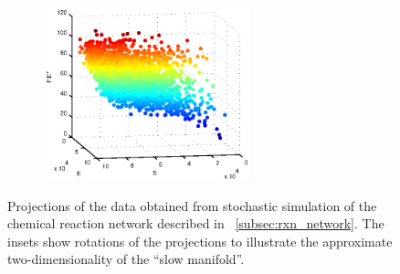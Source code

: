 \begin{figure}[t]
\begin{subfigure}{0.45\textwidth}
\caption{}
\label{subfig:rxn_manifolds3}
\end{subfigure}
\begin{subfigure}{0.45\textwidth}
\includegraphics[height=5cm]{rxn_manifold4}
\caption{}
\label{subfig:rxn_manifolds4}
\end{subfigure}
\caption[Projections of chemical reaction network data]{Projections of the data obtained from stochastic simulation of the chemical reaction network described in \sec~\ref{subsec:rxn_network}. The insets show rotations of the projections to illustrate the approximate two-dimensionality of the ``slow manifold''.}
    \label{fig:rxn_manifolds}
\end{figure}

